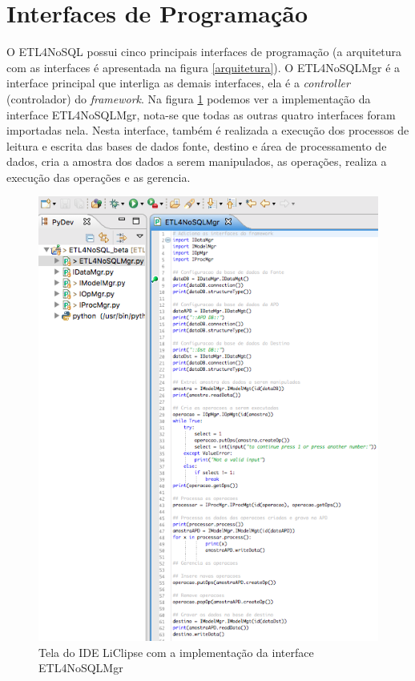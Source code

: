 \section{Interfaces de Programação}

O ETL4NoSQL possui cinco principais interfaces de programação (a arquitetura com as interfaces é apresentada na figura \ref{arquitetura}). O ETL4NoSQLMgr é a interface principal que interliga as demais interfaces, ela é a \textit{controller} (controlador) do \textit{framework}. Na figura \ref{etl4nosqlmgr} podemos ver a implementação da interface ETL4NoSQLMgr, nota-se que todas as outras quatro interfaces foram importadas nela. Nesta interface, também é realizada a execução dos processos de leitura e escrita das bases de dados fonte, destino e área de processamento de dados, cria a amostra dos dados a serem manipulados, as operações, realiza a execução das operações e as gerencia.

\begin{figure}[h!]
	\centering
	\includegraphics[scale=0.8]{fig/etl4nosqlmgr.png}
	\caption{Tela do IDE LiClipse com a implementação da interface ETL4NoSQLMgr}
	\label{etl4nosqlmgr}
\end{figure}

